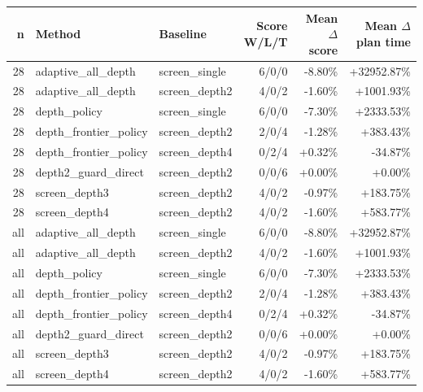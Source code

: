 \begin{tabular}{rllrrr}
\toprule
n & Method & Baseline & Score W/L/T & Mean $\Delta$ score & Mean $\Delta$ plan time \\
\midrule
28 & adaptive\_all\_depth & screen\_single & 6/0/0 & -8.80\% & +32952.87\% \\
28 & adaptive\_all\_depth & screen\_depth2 & 4/0/2 & -1.60\% & +1001.93\% \\
28 & depth\_policy & screen\_single & 6/0/0 & -7.30\% & +2333.53\% \\
28 & depth\_frontier\_policy & screen\_depth2 & 2/0/4 & -1.28\% & +383.43\% \\
28 & depth\_frontier\_policy & screen\_depth4 & 0/2/4 & +0.32\% & -34.87\% \\
28 & depth2\_guard\_direct & screen\_depth2 & 0/0/6 & +0.00\% & +0.00\% \\
28 & screen\_depth3 & screen\_depth2 & 4/0/2 & -0.97\% & +183.75\% \\
28 & screen\_depth4 & screen\_depth2 & 4/0/2 & -1.60\% & +583.77\% \\
all & adaptive\_all\_depth & screen\_single & 6/0/0 & -8.80\% & +32952.87\% \\
all & adaptive\_all\_depth & screen\_depth2 & 4/0/2 & -1.60\% & +1001.93\% \\
all & depth\_policy & screen\_single & 6/0/0 & -7.30\% & +2333.53\% \\
all & depth\_frontier\_policy & screen\_depth2 & 2/0/4 & -1.28\% & +383.43\% \\
all & depth\_frontier\_policy & screen\_depth4 & 0/2/4 & +0.32\% & -34.87\% \\
all & depth2\_guard\_direct & screen\_depth2 & 0/0/6 & +0.00\% & +0.00\% \\
all & screen\_depth3 & screen\_depth2 & 4/0/2 & -0.97\% & +183.75\% \\
all & screen\_depth4 & screen\_depth2 & 4/0/2 & -1.60\% & +583.77\% \\
\bottomrule
\end{tabular}
